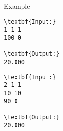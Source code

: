 Example
\begin{verbatim}
\textbf{Input:}
1 1 1
100 0

\textbf{Output:}
20.000
\end{verbatim}
\begin{verbatim}
\textbf{Input:}
2 1 1
10 10
90 0

\textbf{Output:}
20.000\end{verbatim}
